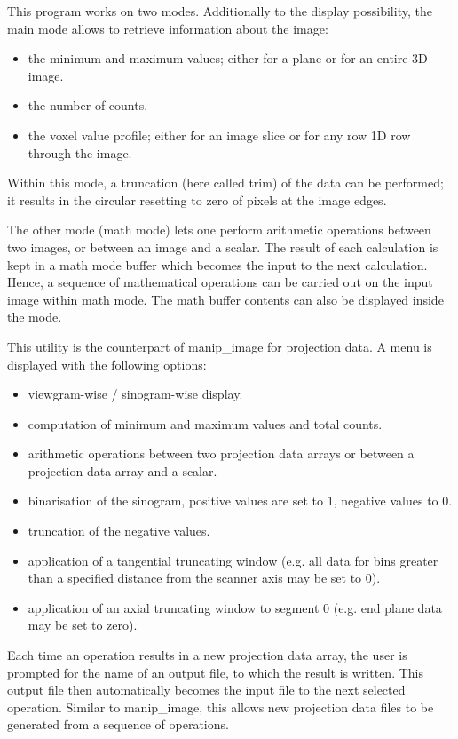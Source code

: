 \documentclass{article}
\begin{document}
{ 
}

This program works on two modes. Additionally to the display 
possibility, the main mode allows to retrieve information about 
the image:

\begin{itemize}
\item the minimum and maximum values; either for a plane or for an 
entire 3D image.
\item the number of counts.
\item the voxel value profile; either for an image slice or for any 
row 1D row through the image.
\end{itemize}
Within this mode, a truncation (here called trim) of the data 
can be performed; it results in the circular resetting to zero 
of pixels at the image edges.


The other mode (math mode) lets one perform arithmetic operations 
between two images, or between an image and a scalar. The result 
of each calculation is kept in a math mode buffer which becomes 
the input to the next calculation. Hence, a sequence of mathematical 
operations can be carried out on the input image within math 
mode. The math buffer contents can also be displayed inside the 
mode.

{ 
}

This utility is the counterpart of manip\_image for projection 
data. A menu is displayed with the following options:

\begin{itemize}
\item viewgram-wise / sinogram-wise display.
\item computation of minimum and maximum values and total counts.
\item arithmetic operations between two projection data arrays or 
between a projection data array and a scalar.
\item binarisation of the sinogram, positive values are set to 1, 
negative values to 0.
\item truncation of the negative values.
\item application of a tangential truncating window (e.g. all data 
for bins greater than a specified distance from the scanner axis 
may be set to 0).
\item application of an axial truncating window to segment 0 (e.g. 
end plane data may be set to zero).
\end{itemize}
Each time an operation results in a new projection data array, 
the user is prompted for the name of an output file, to which 
the result is written. This output file then automatically becomes 
the input file to the next selected operation. Similar to manip\_image, 
this allows new projection data files to be generated from a 
sequence of operations.
\end{document}
